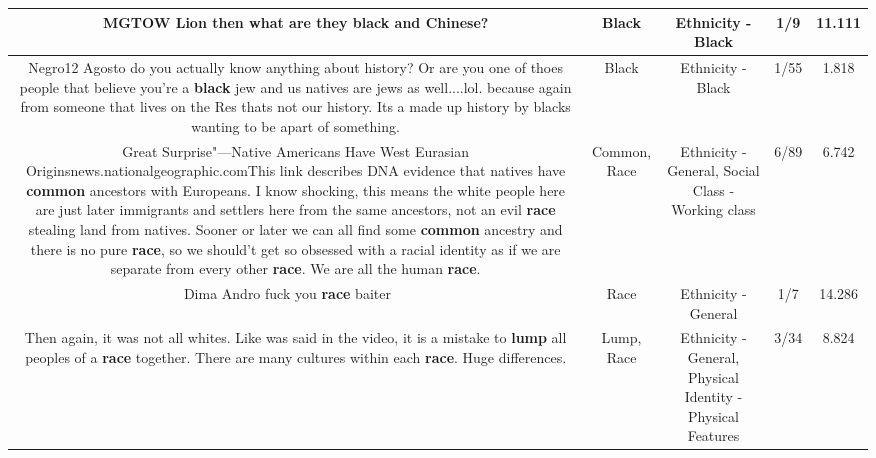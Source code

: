 \documentclass[11pt]{article}
\newlength\mylength
\begin{document}
\begin{center}
\begin{longtable}{|C{.65\mylength}|C{.30\mylength}|C{.12\mylength}|C{.12\mylength}|C{.12\mylength}|}
  \small MGTOW Lion then what are they \textbf{black} and Chinese?\normalsize   & Black & Ethnicity - Black & 1/9 & 11.111 \\  \hline
  \small Negro12 Agosto do you actually know anything about history? Or are you one of thoes people that believe you're a \textbf{black} jew and us natives are jews as well....lol. because again from someone that lives on the Res thats not our history. Its a made up history by blacks wanting to be apart of something.\normalsize   & Black & Ethnicity - Black & 1/55 & 1.818 \\  \hline
  \small Great Surprise"—Native Americans Have West Eurasian Originsnews.nationalgeographic.comThis link describes DNA evidence that natives have \textbf{common} ancestors with Europeans. I know shocking, this means the white people here are just later immigrants and settlers here from the same ancestors, not an evil \textbf{race} stealing land from natives. Sooner or later we can all find some \textbf{common} ancestry and there is no pure \textbf{race}, so we should't get so obsessed with a racial identity as if we are separate from every other \textbf{race}. We are all the human \textbf{race}.\normalsize   & Common, Race & Ethnicity - General, Social Class - Working class & 6/89 & 6.742 \\  \hline
  \small Dima Andro fuck you \textbf{race} baiter 🖕🙄🖕\normalsize   & Race & Ethnicity - General & 1/7 & 14.286 \\  \hline
  \small Then again, it was not all whites. Like was said in the video, it is a mistake to \textbf{lump} all peoples of a \textbf{race} together. There are many cultures within each \textbf{race}. Huge differences.\normalsize   & Lump, Race & Ethnicity - General, Physical Identity - Physical Features & 3/34 & 8.824 \\  \hline

\end{longtable}
\end{center}
\end{document}
